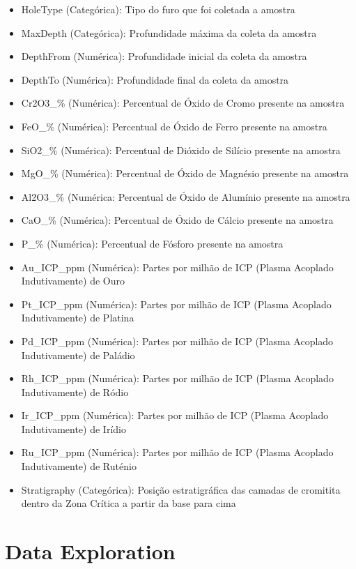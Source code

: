 \documentclass[
]{article}
\begin{document}
\begin{itemize}
\item
  HoleType (Categórica): Tipo do furo que foi coletada a amostra
\item
  MaxDepth (Categórica): Profundidade máxima da coleta da amostra
\item
  DepthFrom (Numérica): Profundidade inicial da coleta da amostra
\item
  DepthTo (Numérica): Profundidade final da coleta da amostra
\item
  Cr2O3\_\% (Numérica): Percentual de Óxido de Cromo presente na amostra
\item
  FeO\_\% (Numérica): Percentual de Óxido de Ferro presente na amostra
\item
  SiO2\_\% (Numérica): Percentual de Dióxido de Silício presente na amostra
\item
  MgO\_\% (Numérica): Percentual de Óxido de Magnésio presente na amostra
\item
  Al2O3\_\% (Numérica: Percentual de Óxido de Alumínio presente na amostra
\item
  CaO\_\% (Numérica): Percentual de Óxido de Cálcio presente na amostra
\item
  P\_\% (Numérica): Percentual de Fósforo presente na amostra
\item
  Au\_ICP\_ppm (Numérica): Partes por milhão de ICP (Plasma Acoplado Indutivamente) de Ouro
\item
  Pt\_ICP\_ppm (Numérica): Partes por milhão de ICP (Plasma Acoplado Indutivamente) de Platina
\item
  Pd\_ICP\_ppm (Numérica): Partes por milhão de ICP (Plasma Acoplado Indutivamente) de Paládio
\item
  Rh\_ICP\_ppm (Numérica): Partes por milhão de ICP (Plasma Acoplado Indutivamente) de Ródio
\item
  Ir\_ICP\_ppm (Numérica): Partes por milhão de ICP (Plasma Acoplado Indutivamente) de Irídio
\item
  Ru\_ICP\_ppm (Numérica): Partes por milhão de ICP (Plasma Acoplado Indutivamente) de Ruténio
\item
  Stratigraphy (Categórica): Posição estratigráfica das camadas de cromitita dentro da Zona Crítica a partir da base para cima
\end{itemize}

\newpage

\hypertarget{data-exploration}{%
\section{Data Exploration}\label{data-exploration}}
\end{document}
